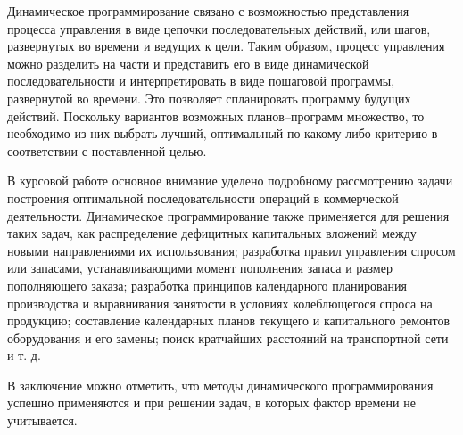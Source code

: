 
Динамическое программирование связано с возможностью представления процесса управления в виде цепочки последовательных действий, или шагов, развернутых во времени и ведущих к цели. Таким образом, процесс управления можно разделить на части и представить его в виде динамической последовательности и интерпретировать в виде пошаговой программы, развернутой во времени. Это позволяет спланировать программу будущих действий. Поскольку вариантов возможных планов–программ множество, то необходимо из них выбрать лучший, оптимальный по какому-либо критерию в соответствии с поставленной целью.

В курсовой работе основное внимание уделено подробному рассмотрению задачи построения оптимальной последовательности операций в коммерческой деятельности. Динамическое программирование также применяется для решения таких задач, как распределение дефицитных капитальных вложений между новыми направлениями их использования; разработка правил управления спросом или запасами, устанавливающими момент пополнения запаса и размер пополняющего заказа; разработка принципов календарного планирования производства и выравнивания занятости в условиях колеблющегося спроса на продукцию; составление календарных планов текущего и капитального ремонтов оборудования и его замены; поиск кратчайших расстояний на транспортной сети и т. д.

В заключение можно отметить, что методы динамического программирования успешно применяются и при решении задач, в которых фактор времени не учитывается.